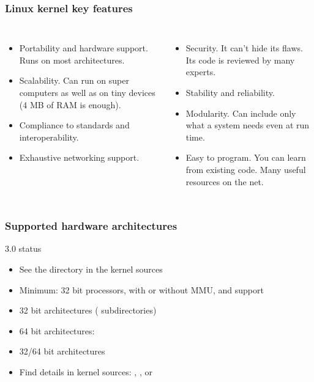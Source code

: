 \begin{frame}
  \frametitle{Linux kernel key features}
  \begin{columns}
    \begin{itemize}
    \item Portability and hardware support. Runs on most
      architectures.
    \item Scalability. Can run on super computers as well as on tiny
      devices (4 MB of RAM is enough).
    \item Compliance to standards and interoperability.
    \item Exhaustive networking support.
    \end{itemize}
    \begin{itemize}
    \item Security. It can't hide its flaws. Its code is reviewed by
      many experts.
    \item Stability and reliability.
    \item Modularity. Can include only what a system needs even at run
      time.
    \item Easy to program. You can learn from existing code. Many
      useful resources on the net.
    \end{itemize}
  \end{columns}
\end{frame}

\begin{frame}
  \frametitle{Supported hardware architectures}
  3.0 status
  \begin{itemize}
  \item See the  directory in the kernel sources
  \item Minimum: 32 bit processors, with or without MMU, and
     support
  \item 32 bit architectures ( subdirectories)\\
  \item 64 bit architectures:\\
  \item 32/64 bit architectures\\
  \item Find details in kernel sources: ,
    , or 
  \end{itemize}
\end{frame}

